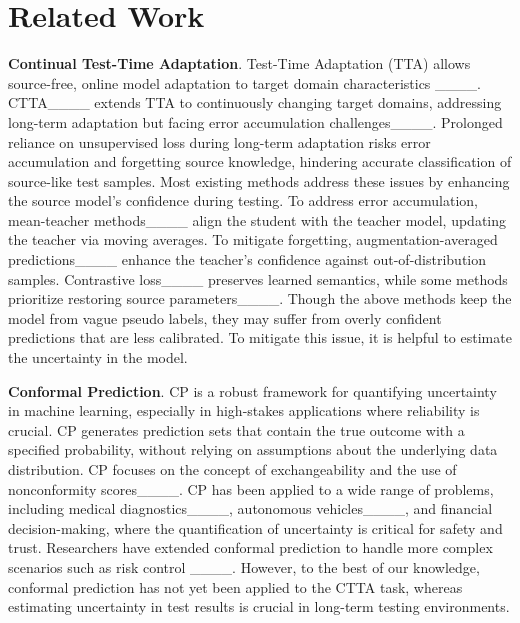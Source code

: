 \section{Related Work}
\textbf{Continual Test-Time Adaptation}.
Test-Time Adaptation (TTA) allows source-free, online model adaptation to target domain characteristics ____. CTTA____ extends TTA to continuously changing target domains, addressing long-term adaptation but facing error accumulation challenges____. 
Prolonged reliance on unsupervised loss during long-term adaptation risks error accumulation and forgetting source knowledge, hindering accurate classification of source-like test samples. Most existing methods address these issues by enhancing the source model's confidence during testing.
To address error accumulation, mean-teacher methods____ align the student with the teacher model, updating the teacher via moving averages. To mitigate forgetting, augmentation-averaged predictions____ enhance the teacher's confidence against out-of-distribution samples. 
Contrastive loss____ preserves learned semantics, while some methods prioritize restoring source parameters____.
Though the above methods keep the model from vague pseudo labels, they may suffer from overly confident predictions that are less calibrated.
To mitigate this issue, it is helpful to estimate the uncertainty in the model.

\noindent
\textbf{Conformal Prediction}.
CP is a robust framework for quantifying uncertainty in machine learning, especially in high-stakes applications where reliability is crucial. 
CP generates prediction sets that contain the true outcome with a specified probability, without relying on assumptions about the underlying data distribution. CP focuses on the concept of exchangeability and the use of nonconformity scores____.
CP has been applied to a wide range of problems, including medical diagnostics____, autonomous vehicles____, and financial decision-making, where the quantification of uncertainty is critical for safety and trust.
Researchers have extended conformal prediction to handle more complex scenarios such as risk control ____.
However, to the best of our knowledge, conformal prediction has not yet been applied to the CTTA task, whereas estimating uncertainty in test results is crucial in long-term testing environments.